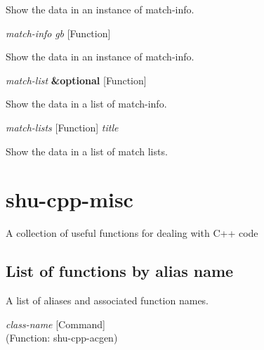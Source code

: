 \begin{doc-string}
Show the data in an instance of match-info.
\end{doc-string}

\vspace{1em}
\noindent
{}
\usebox{\funcname}\emph{match-info} \emph{gb}
 \hfill [Function]

\begin{doc-string}
Show the data in an instance of match-info.
\end{doc-string}

\vspace{1em}
\noindent
{}
\usebox{\funcname}\emph{match-list} \textbf{\&optional}
 \hfill [Function]
\hspace*{\wd\funcname}

\begin{doc-string}
Show the data in a list of match-info.
\end{doc-string}

\vspace{1em}
\noindent
{}
\usebox{\funcname}\emph{match-lists}
 \hfill [Function]
\hspace*{\wd\funcname}\emph{title}

\begin{doc-string}
Show the data in a list of match lists.
\end{doc-string}

\eject
\section{shu-cpp-misc}


A collection of useful functions for dealing with C++ code


\subsection{List of functions by alias name}

A list of aliases and associated function names.



\vspace{1em}
\noindent
{}
\usebox{\funcname}\emph{class-name}
 \hfill [Command]\\%
 (Function: shu-cpp-acgen)

